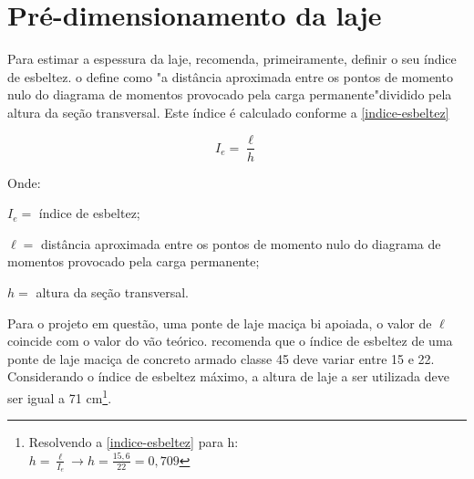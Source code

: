 \begin{table}[htb]
\end{table}

\section{Pré-dimensionamento da laje}

Para estimar a espessura da laje,  recomenda, primeiramente, definir o
seu índice de esbeltez.  o define como "a distância aproximada entre os pontos de
momento nulo do diagrama de momentos provocado pela carga permanente"dividido pela altura da seção
transversal. Este índice é calculado conforme a \autoref{indice-esbeltez}

\begin{equation}\label{indice-esbeltez}
I_e = \frac{\ell}{h}
\end{equation}

Onde:

$ I_e = $ índice de esbeltez;

$ \ell = $ distância aproximada entre os pontos de momento nulo do diagrama de momentos provocado pela carga permanente;

$ h = $ altura da seção transversal.


Para o projeto em questão, uma ponte de laje maciça bi apoiada, o valor de $ \ell $ coincide com o valor
do vão teórico.  recomenda que o índice de esbeltez de uma ponte de laje maciça
de concreto armado classe 45 deve variar entre 15 e 22. Considerando o índice de esbeltez máximo, a
altura de laje a ser utilizada deve ser igual a 71 cm\footnote{Resolvendo a \autoref{indice-esbeltez} para h:\\ $ h = \frac{\ell}{I_e} \rightarrow h = \frac{15,6}{22} = 0,709 $}.

